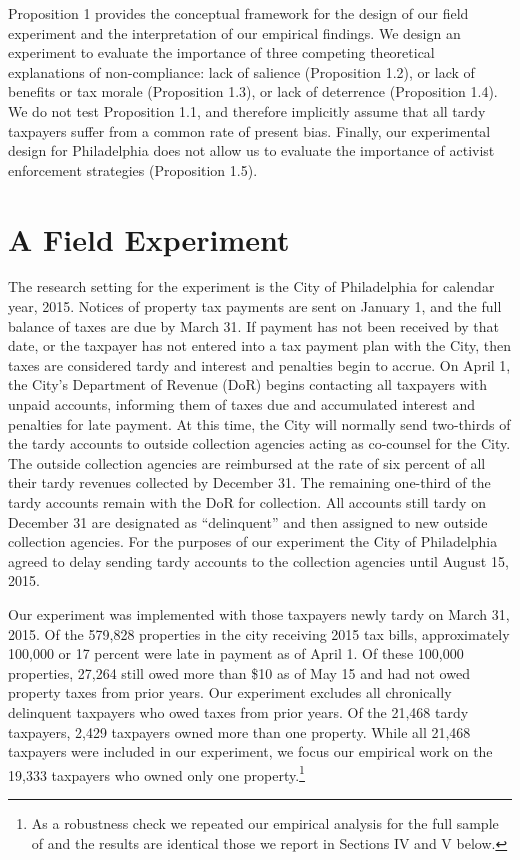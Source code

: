 \documentclass[12pt]{article}
\begin{document}
Proposition 1 provides the conceptual framework for the design 
of our field experiment and the interpretation of our empirical findings. We design an experiment to evaluate the importance of three
competing theoretical explanations of non-compliance: lack of salience (Proposition 1.2), or lack of benefits or tax morale (Proposition 1.3), or lack of deterrence (Proposition 1.4). We do not test Proposition 1.1, and therefore implicitly assume that
all tardy taxpayers suffer from a common rate of present bias. Finally, our experimental design for Philadelphia does not allow us to evaluate the importance of 
activist enforcement strategies (Proposition 1.5). 

\section{A Field Experiment }


The research setting for the experiment is the City of Philadelphia
for calendar year, 2015.  Notices of property tax payments are sent on
January 1, and the full balance of taxes are due by March 31.  If
payment has not been received by that date, or the taxpayer has not
entered into a tax payment plan with the City, then taxes are
considered tardy and interest and penalties begin to accrue.  On
April 1, the City's Department of Revenue (DoR) begins contacting all
taxpayers with unpaid accounts, informing them of taxes due and
accumulated interest and penalties for late payment.  At this time,
the City will normally send two-thirds of the tardy accounts to outside collection agencies acting as co-counsel for the City. The outside collection agencies are reimbursed at the rate of six percent of all their tardy revenues collected by December 31. The remaining one-third of the tardy accounts remain with the DoR for collection. All accounts still tardy on December 31 are designated as ``delinquent'' and then assigned to new outside collection agencies. For the purposes of our experiment the City of Philadelphia agreed to delay sending tardy accounts to the collection agencies until August 15, 2015.

Our experiment was implemented with those taxpayers newly tardy on March 31, 2015. Of the 579,828 properties in the city receiving 2015 tax bills, approximately 100,000 or 17 percent were late in payment as of April 1. Of these 100,000 properties, 27,264 still owed more than \$10 as of May 15 and had not owed property taxes from prior years. Our experiment excludes all chronically delinquent taxpayers who owed taxes from prior years. Of the 21,468 tardy taxpayers, 2,429 taxpayers owned more than one property. While all 21,468 taxpayers were included in our experiment, we focus our empirical work on the 19,333 taxpayers who owned only one property.\footnote{ As a
  robustness check we repeated our empirical analysis for the full
  sample of and the results are identical those we report in Sections
  IV and V below. }  
\end{document}
